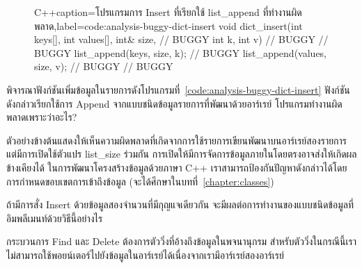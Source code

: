 \begin{figure}
\latintext
\begin{codelist}{C++}{caption={\thaitext โปรแกรม{\wbr}การ Insert ที่{\wbr}เรียก{\wbr}ใช้ {\ct list\_append} ที่ทำงาน{\wbr}ผิดพลาด\latintext},label=code:analysis-buggy-dict-insert}
void dict_insert(int keys[], int values[], int& size,  // BUGGY
                 int k, int v)                         // BUGGY
{                                                      // BUGGY
  list_append(keys, size, k);                          // BUGGY
  list_append(values, size, v);                        // BUGGY 
}                                                      // BUGGY
\end{codelist}
\thaitext
\end{figure}

\begin{quiz}{}
พิจารณา{\wbr}ฟังก์ชัน{\wbr}เพิ่ม{\wbr}ข้อมูล{\wbr}ใน{\wbr}รายการ{\wbr}ดัง{\wbr}โปรแกรม{\wbr}ที่~\ref{code:analysis-buggy-dict-insert}
ฟังก์ชัน{\wbr}ดังกล่าว{\wbr}เรียก{\wbr}ใช้{\wbr}การ Append จาก{\wbr}แบบ{\wbr}ชนิด{\wbr}ข้อมูล{\wbr}รายการ{\wbr}ที่{\wbr}พัฒนา{\wbr}ด้วย{\wbr}อาร์เรย์
โปรแกรม{\wbr}ทำงาน{\wbr}ผิดพลาด{\wbr}เพราะว่า{\wbr}อะไร? 
\end{quiz}

ตัวอย่าง{\wbr}ข้างต้น{\wbr}แสดง{\wbr}ให้{\wbr}เห็น{\wbr}ความผิด{\wbr}พลาด{\wbr}ที่{\wbr}เกิด{\wbr}จาก{\wbr}การ{\wbr}ใช้{\wbr}รายการ{\wbr}เขียน{\wbr}พัฒนา{\wbr}บน{\wbr}อาร์เรย์{\wbr}สอง{\wbr}รายการ{\wbr}
แต่{\wbr}มี{\wbr}การ{\wbr}เปิด{\wbr}ใช้{\wbr}ตัวแปร {\ct list\_size} ร่วม{\wbr}กัน{\wbr}
การ{\wbr}เปิด{\wbr}ให้{\wbr}มี{\wbr}การ{\wbr}จัดการ{\wbr}ข้อมูล{\wbr}ภายใน{\wbr}โดย{\wbr}ตรง{\wbr}อาจ{\wbr}ส่ง{\wbr}ให้{\wbr}เกิด{\wbr}ผลข้างเคียง{\wbr}ได้{\wbr}
ใน{\wbr}การ{\wbr}พัฒนา{\wbr}โครงสร้าง{\wbr}ข้อมูล{\wbr}ด้วย{\wbr}ภาษา C++
เรา{\wbr}สามารถ{\wbr}ป้องกัน{\wbr}ปัญหา{\wbr}ดังกล่าว{\wbr}ได้{\wbr}โดย{\wbr}การ{\wbr}กำหนด{\wbr}ขอบเขต{\wbr}การ{\wbr}เข้าถึง{\wbr}ข้อมูล{\wbr}
(จะ{\wbr}ได้{\wbr}ศึกษา{\wbr}ใน{\wbr}บท{\wbr}ที่~\ref{chapter:classes})

\begin{quiz}{}
ถ้า{\wbr}มี{\wbr}การ{\wbr}สั่ง Insert ด้วย{\wbr}ข้อมูล{\wbr}สอง{\wbr}จำนวน{\wbr}ที่{\wbr}มี{\wbr}กุญแจ{\wbr}เดียวกัน{\wbr}
จะ{\wbr}มี{\wbr}ผล{\wbr}ต่อ{\wbr}การ{\wbr}ทำงาน{\wbr}ของ{\wbr}แบบ{\wbr}ชนิด{\wbr}ข้อมูล{\wbr}ที่{\wbr}อิม{\wbr}พลี{\wbr}เมนท์{\wbr}ด้วย{\wbr}วิธี{\wbr}นี้{\wbr}อย่างไร{\wbr}
\end{quiz}

กระบวนการ Find และ Delete ต้องการ{\wbr}ตัว{\wbr}วิ่ง{\wbr}ที่{\wbr}อ้าง{\wbr}ถึง{\wbr}ข้อมูล{\wbr}ใน{\wbr}พจนานุกรม{\wbr}
สำหรับ{\wbr}ตัว{\wbr}วิ่ง{\wbr}ใน{\wbr}กรณี{\wbr}นี้{\wbr}เรา{\wbr}ไม่{\wbr}สามารถ{\wbr}ใช้{\wbr}พอยน์เตอร์{\wbr}ไป{\wbr}ยัง{\wbr}ข้อมูล{\wbr}ใน{\wbr}อาร์เรย์{\wbr}ได้{\wbr}เนื่องจาก{\wbr}เรา{\wbr}มี{\wbr}อาร์เรย์{\wbr}สอง{\wbr}อาร์เรย์

